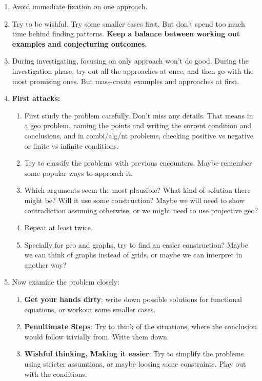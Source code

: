 \begin{enumerate}
    \item Avoid immediate fixation on one approach.
    \item Try to be wishful. Try some smaller cases first. But don't spend too
        much time behind finding patterns. \textbf{Keep a balance between
        working out examples and conjecturing outcomes.}
    \item During investigating, focusing on only approach won't do good.
        During the investigation phase, try out all the approaches at once,
        and then go with the most promising ones. But mass-create examples and
        approaches at first.
    \item \textbf{First attacks:}
        \begin{enumerate}
            \item First study the problem carefully. Don't miss any details.
                That means in a geo problem, naming the points and writing the
                corrent condition and conclusions, and in combi/alg/nt
                problems, checking positive vs negative or finite vs infinite
                conditions.
            \item Try to classify the problems with previous encounters. Maybe
                remember some popular ways to approach it.
            \item Which arguments seem the most plausible? What kind of
                solution there might be? Will it use some construction? Maybe
                we will need to show contradiction assuming otherwise, or we
                might need to use projective geo?
            \item Repeat at least twice. 
            \item Specially for geo and graphs, try to find an easier
                construction? Maybe we can think of graphs instead of grids,
                or maybe we can interpret in another way?
        \end{enumerate}
    \item Now examine the problem closely:
        \begin{enumerate}
            \item \textbf{Get your hands dirty}: write down possible solutions
                for functional equations, or workout some smaller cases.
            \item \textbf{Penultimate Steps}: Try to think of the situations,
                where the conclusion would follow trivially from. Write them
                down.
            \item \textbf{Wishful thinking, Making it easier}: Try to simplify
                the problems using stricter assumtions, or maybe loosing some
                constraints. Play out with the conditions.
        \end{enumerate}
\end{enumerate}
